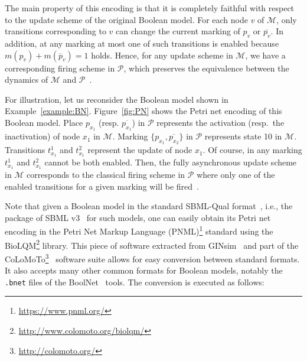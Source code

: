 \documentclass[runningheads]{llncs}
\begin{document}
The main property of this encoding is that it is completely faithful with respect to the update scheme of the original Boolean model.
For each node \(v\) of \(\mathcal{M}\), only transitions corresponding to \(v\) can change the current marking of \(p_v\) or \(\overline{p_v}\).
In addition, at any marking at most one of such transitions is enabled because \(m(p_v) + m(\overline{p}_v) = 1\) holds.
Hence, for any update scheme in \(\mathcal{M}\), we have a corresponding firing scheme in \(\mathcal{P}\), which preserves the equivalence between the dynamics of \(\mathcal{M}\) and \(\mathcal{P}\)~\cite{DBLP:journals/nc/ChatainHKPT20}.

For illustration, let us reconsider the Boolean model shown in Example~\ref{example:BN}.
Figure~\ref{fig:PN} shows the Petri net encoding of this Boolean model.
Place \(p_{x_1}\) (resp. \(\overline{p_{x_1}}\)) in \(\mathcal{P}\) represents the activation (resp.\ the inactivation) of node \(x_1\) in \(\mathcal{M}\).
Marking \(\{p_{x_1}, \overline{p_{x_2}}\}\) in \(\mathcal{P}\) represents state 10 in \(\mathcal{M}\).
Transitions \(t^{1}_{x_1}\) and \(t^{2}_{x_1}\) represent the update of node \(x_1\).
Of course, in any marking \(t^{1}_{x_1}\) and \(t^{2}_{x_1}\) cannot be both enabled.
Then, the fully asynchronous update scheme in \(\mathcal{M}\) corresponds to the classical firing scheme in \(\mathcal{P}\) where only one of the enabled transitions for a given marking will be fired~\cite{Murata1989}.


Note that given a Boolean model in the standard SBML-Qual format~\cite{chaouiya2013sbml}, i.e., the package of SBML v3~\cite{keating2020sbml} for such models, one can easily obtain its Petri net encoding in the Petri Net Markup Language  (PNML)\footnote{\url{https://www.pnml.org/}} standard using the BioLQM\footnote{\url{http://www.colomoto.org/biolqm/}} library.
This piece of software extracted from GINsim~\cite{chaouiya2012logical} and part of the CoLoMoTo\footnote{\url{http://colomoto.org/}}~\cite{naldi2015cooperative} software suite allows for easy conversion between standard formats.
It also accepts many other common formats for Boolean models, notably the \verb|.bnet| files of the  BoolNet~\cite{mussel2010boolnet,klarner2017pyboolnet} tools.
The conversion is executed as follows:

\end{document}
